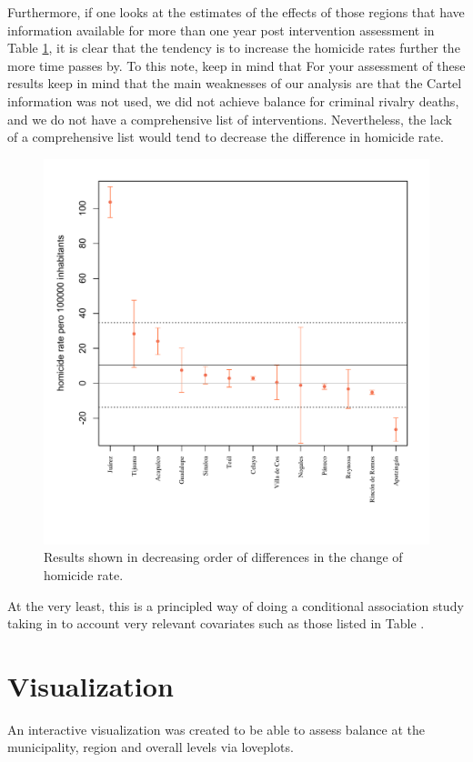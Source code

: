 \documentclass{article}[11 pt]
\begin{document}
Furthermore, if one looks at the estimates of the effects of those regions that have information available for more than one year post intervention assessment in Table \ref{}, it is clear that the tendency is to increase the homicide rates further the more time passes by. To this note, keep in mind that  
For your assessment of these results keep in mind that the main weaknesses of our analysis are that the Cartel information was not used, we did not achieve balance for criminal rivalry deaths, and we do not have a comprehensive list of interventions. Nevertheless, the lack of a comprehensive list would tend to decrease the difference in homicide rate. %
 
\begin{figure}[htdp]
	\centering
  \includegraphics[scale=0.5]{Images/results.pdf}
  \caption{Results shown in decreasing order of differences in the change of homicide rate.}
\label{figResults}
\end{figure}



At the very least, this is a principled way of doing a conditional association study taking in to account very relevant covariates such as those listed in Table \label{Tab1}.

\section{Visualization}
An interactive visualization was created to be able to assess balance at the municipality, region and overall levels via loveplots. 
\end{document}
